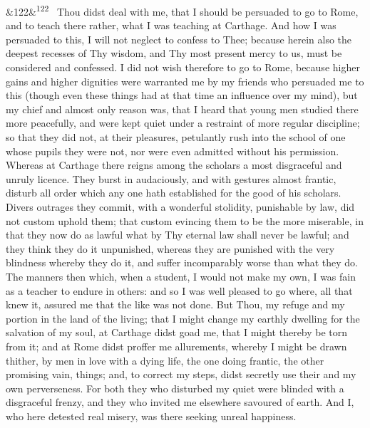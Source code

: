 \documentclass[12pt]{article}
\newcommand{\para}[1][]{\par\noindent\ifx&#1&\else\textsuperscript{\footnotesize #1}~\fi}
\begin{document}
\para[122] Thou didst deal with me, that I should be persuaded to go to Rome, and to teach there rather, what I was teaching at Carthage. And how I was persuaded to this, I will not neglect to confess to Thee; because herein also the deepest recesses of Thy wisdom, and Thy most present mercy to us, must be considered and confessed. I did not wish therefore to go to Rome, because higher gains and higher dignities were warranted me by my friends who persuaded me to this (though even these things had at that time an influence over my mind), but my chief and almost only reason was, that I heard that young men studied there more peacefully, and were kept quiet under a restraint of more regular discipline; so that they did not, at their pleasures, petulantly rush into the school of one whose pupils they were not, nor were even admitted without his permission. Whereas at Carthage there reigns among the scholars a most disgraceful and unruly licence. They burst in audaciously, and with gestures almost frantic, disturb all order which any one hath established for the good of his scholars. Divers outrages they commit, with a wonderful stolidity, punishable by law, did not custom uphold them; that custom evincing them to be the more miserable, in that they now do as lawful what by Thy eternal law shall never be lawful; and they think they do it unpunished, whereas they are punished with the very blindness whereby they do it, and suffer incomparably worse than what they do. The manners then which, when a student, I would not make my own, I was fain as a teacher to endure in others: and so I was well pleased to go where, all that knew it, assured me that the like was not done. But Thou, my refuge and my portion in the land of the living; that I might change my earthly dwelling for the salvation of my soul, at Carthage didst goad me, that I might thereby be torn from it; and at Rome didst proffer me allurements, whereby I might be drawn thither, by men in love with a dying life, the one doing frantic, the other promising vain, things; and, to correct my steps, didst secretly use their and my own perverseness. For both they who disturbed my quiet were blinded with a disgraceful frenzy, and they who invited me elsewhere savoured of earth. And I, who here detested real misery, was there seeking unreal happiness.
\end{document}
